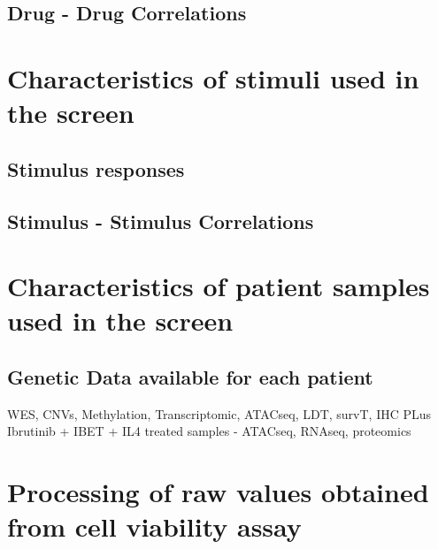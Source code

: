 \documentclass[11pt, a4paper, twosided]{book}
\begin{document}
\hypertarget{drug---drug-correlations}{%
\subsection{Drug - Drug Correlations}\label{drug---drug-correlations}}

\hypertarget{characteristics-of-stimuli-used-in-the-screen}{%
\section{Characteristics of stimuli used in the screen}\label{characteristics-of-stimuli-used-in-the-screen}}

\hypertarget{stimulus-responses}{%
\subsection{Stimulus responses}\label{stimulus-responses}}

\hypertarget{stimulus---stimulus-correlations}{%
\subsection{Stimulus - Stimulus Correlations}\label{stimulus---stimulus-correlations}}

\hypertarget{characteristics-of-patient-samples-used-in-the-screen}{%
\section{Characteristics of patient samples used in the screen}\label{characteristics-of-patient-samples-used-in-the-screen}}

\hypertarget{genetic-data-available-for-each-patient}{%
\subsection{Genetic Data available for each patient}\label{genetic-data-available-for-each-patient}}

WES, CNVs, Methylation, Transcriptomic, ATACseq, LDT, survT, IHC
PLus Ibrutinib + IBET + IL4 treated samples - ATACseq, RNAseq, proteomics

\hypertarget{processing-of-raw-values-obtained-from-cell-viability-assay}{%
\section{Processing of raw values obtained from cell viability assay}\label{processing-of-raw-values-obtained-from-cell-viability-assay}}
\end{document}
